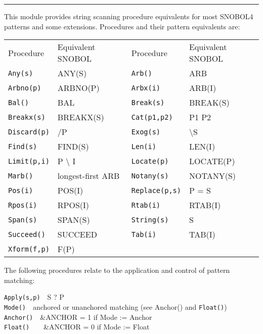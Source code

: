 \vspace{0.25cm}\hrule{}

This module provides string scanning procedure equivalents for most
SNOBOL4 patterns and some
extensions. Procedures and their pattern equivalents are:

\begin{supertabular}{m{1.2in} m{1.7in} m{1.2in} m{1.7in}}

Procedure & Equivalent SNOBOL & Procedure & Equivalent SNOBOL \\

\texttt{Any(s)} & ANY(S) & \texttt{Arb()} & ARB\\
\texttt{Arbno(p)} & ARBNO(P) & \texttt{Arbx(i)} & ARB(I)\\
\texttt{Bal()} & BAL & \texttt{Break(s)} & BREAK(S)\\
\texttt{Breakx(s)} & BREAKX(S) & \texttt{Cat(p1,p2)} & P1 P2\\
\texttt{Discard(p)} & /P & \texttt{Exog(s)} & {\textbackslash}S\\
\texttt{Find(s)} & FIND(S) & \texttt{Len(i)} & LEN(I)\\
\texttt{Limit(p,i)} & P {\textbackslash} I & \texttt{Locate(p)} & LOCATE(P)\\
\texttt{Marb()} & longest-first ARB & \texttt{Notany(s)} & NOTANY(S)\\
\texttt{Pos(i)} & POS(I) & \texttt{Replace(p,s)} & P = S\\
\texttt{Rpos(i)} & RPOS(I) & \texttt{Rtab(i)} & RTAB(I)\\
\texttt{Span(s)} & SPAN(S) & \texttt{String(s)} & S\\
\texttt{Succeed()} & SUCCEED & \texttt{Tab(i)} & TAB(I)\\
\texttt{Xform(f,p)} & F(P) \\
\end{supertabular}

The following procedures relate to the application and control of
pattern matching:

\texttt{Apply(s,p)}\ \ S ? P\\
\texttt{Mode()}\ \ anchored or unanchored matching (see Anchor() and
\texttt{Float()})\\
\texttt{Anchor()}\ \ \&ANCHOR = 1 if Mode := Anchor\\
\texttt{Float()}\ \ \ \ \&ANCHOR = 0 if Mode := Float


